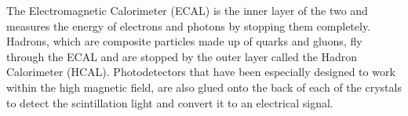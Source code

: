 

The Electromagnetic Calorimeter (ECAL) is the inner layer of the two and measures the energy of electrons and photons by stopping them completely. Hadrons, which are composite particles made up of quarks and gluons, fly through the ECAL and are stopped by the outer layer called the Hadron Calorimeter (HCAL). Photodetectors that have been especially designed to work within the high magnetic field, are also glued onto the back of each of the crystals to detect the scintillation light and convert it to an electrical signal.
 

